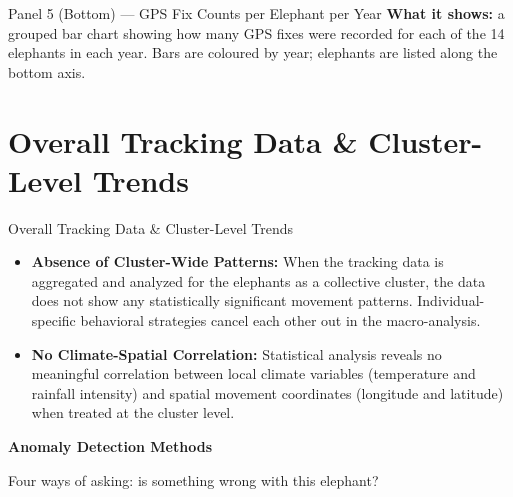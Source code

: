 \documentclass{beamer}
\begin{document}
	
	
	
	
	
	\begin{frame}{Panel 5 (Bottom) --- GPS Fix Counts per Elephant per Year}
		\Large
		\textbf{What it shows:} a grouped bar chart showing how many GPS fixes were
		recorded for each of the 14 elephants in each year. Bars are coloured by
		year; elephants are listed along the bottom axis.
	\end{frame}
	
	
	
	
	\section{Overall Tracking Data \& Cluster-Level Trends}
	\begin{frame}{Overall Tracking Data \& Cluster-Level Trends}
		\large
		\begin{itemize}[label=\textbullet]
			\item \textbf{Absence of Cluster-Wide Patterns:} When the tracking data is aggregated and analyzed for the elephants as a collective cluster, the data does not show any statistically significant movement patterns. Individual-specific behavioral strategies cancel each other out in the macro-analysis.
			\vspace{0.3cm}
			
			\item \textbf{No Climate-Spatial Correlation:} Statistical analysis reveals no meaningful correlation between local climate variables (temperature and rainfall intensity) and spatial movement coordinates (longitude and latitude) when treated at the cluster level.
		\end{itemize}
	\end{frame}
	
	
	
	
	
	
	\begin{frame}
		\centering
		
		\vfill
		
		{\Huge\bfseries Anomaly Detection Methods}
		
		\vspace{0.8cm}
		
		{\Large Four ways of asking: is something wrong with this elephant?}
		
		\vfill
	\end{frame}
	
	
	
\end{document}
